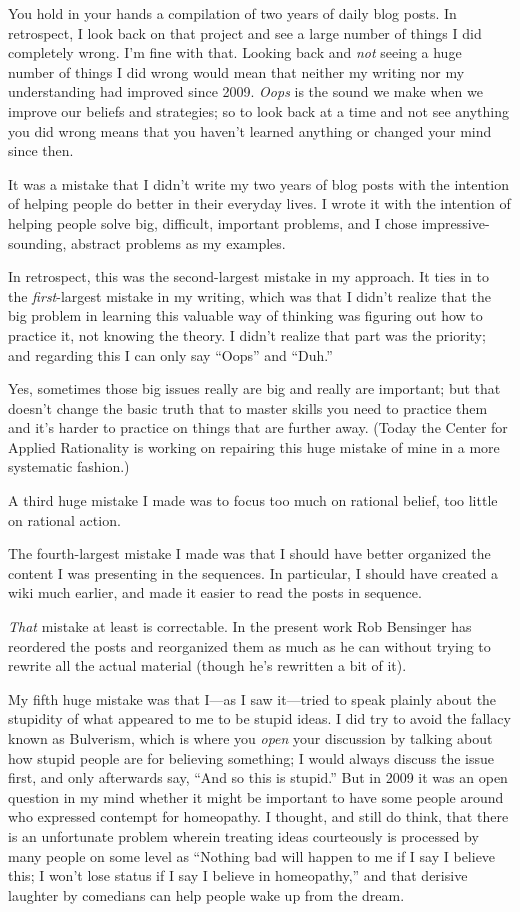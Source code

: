 \documentclass[letterpaper]{book}
\begin{document}
{
 You hold in your hands a compilation of two years of daily blog
posts. In retrospect, I look back on that project and see a large
number of things I did completely wrong. I'm fine with
that. Looking back and \textit{not} seeing a huge number of things I
did wrong would mean that neither my writing nor my understanding had
improved since 2009. \textit{Oops} is the sound we make when we improve
our beliefs and strategies; so to look back at a time and not see
anything you did wrong means that you haven't learned
anything or changed your mind since then.}

{
 It was a mistake that I didn't write my two years
of blog posts with the intention of helping people do better in their
everyday lives. I wrote it with the intention of helping people solve
big, difficult, important problems, and I chose impressive-sounding,
abstract problems as my examples.}

{
 In retrospect, this was the second-largest mistake in my approach.
It ties in to the \textit{first}{}-largest mistake in my writing, which
was that I didn't realize that the big problem in
learning this valuable way of thinking was figuring out how to practice
it, not knowing the theory. I didn't realize that part
was the priority; and regarding this I can only say
``Oops'' and
``Duh.''}

{
 Yes, sometimes those big issues really are big and really are
important; but that doesn't change the basic truth that
to master skills you need to practice them and it's
harder to practice on things that are further away. (Today the Center
for Applied Rationality is working on repairing this huge mistake of
mine in a more systematic fashion.)}

{
 A third huge mistake I made was to focus too much on rational
belief, too little on rational action.}

{
 The fourth-largest mistake I made was that I should have better
organized the content I was presenting in the sequences. In particular,
I should have created a wiki much earlier, and made it easier to read
the posts in sequence.}

{
 \textit{That} mistake at least is correctable. In the present work
Rob Bensinger has reordered the posts and reorganized them as much as
he can without trying to rewrite all the actual material (though
he's rewritten a bit of it).}

{
 My fifth huge mistake was that I---as I saw it---tried to speak
plainly about the stupidity of what appeared to me to be stupid ideas.
I did try to avoid the fallacy known as Bulverism, which is where you
\textit{open} your discussion by talking about how stupid people are
for believing something; I would always discuss the issue first, and
only afterwards say, ``And so this is
stupid.'' But in 2009 it was an open question in my
mind whether it might be important to have some people around who
expressed contempt for homeopathy. I thought, and still do think, that
there is an unfortunate problem wherein treating ideas courteously is
processed by many people on some level as ``Nothing
bad will happen to me if I say I believe this; I won't
lose status if I say I believe in homeopathy,'' and
that derisive laughter by comedians can help people wake up from the
dream.}
\end{document}
